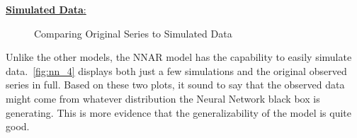 \documentclass{article}\usepackage[]{graphicx}\usepackage[]{color}
\newenvironment{knitrout}{}{} %
\begin{document}
\noindent\underline{\textbf{Simulated Data}:}
\vspace{-20 pt}
\begin{knitrout}
\color{fgcolor}\begin{figure}[H]

{\centering {}

}

\caption[Comparing Original Series to Simulated Data]{Comparing Original Series to Simulated Data}\label{fig:nn_4}
\end{figure}


\end{knitrout}

Unlike the other models, the NNAR model has the capability to easily simulate data.~\autoref{fig:nn_4} displays both just a few simulations and the original observed series in full. Based on these two plots, it sound to say that the observed data might come from whatever distribution the Neural Network black box is generating. This is more evidence that the generalizability of the model is quite good.
\end{document}
